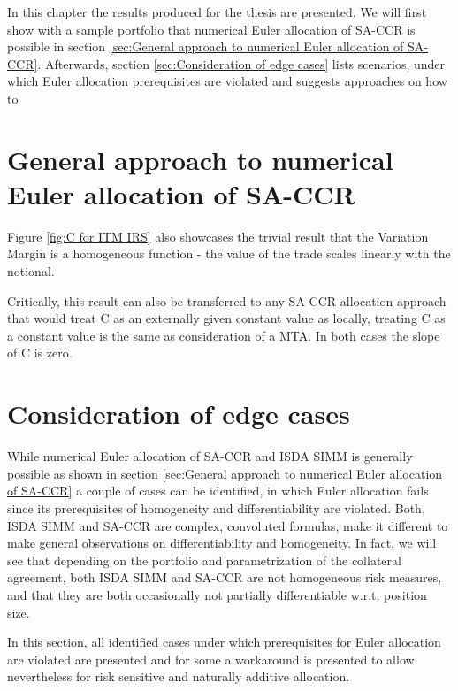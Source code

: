\documentclass[../Thesis_AHoecherl.tex]{subfiles}
\begin{document}
    In this chapter the results produced for the thesis are presented. We will first show with a sample portfolio that numerical Euler allocation of SA-CCR is possible in section \ref{sec:General approach to numerical Euler allocation of SA-CCR}. 
    Afterwards, section \ref{sec:Consideration of edge cases} lists scenarios, under which Euler allocation prerequisites are violated and suggests approaches on how to 

    \section{General approach to numerical Euler allocation of SA-CCR\label{sec:General approach to numerical Euler allocation of SA-CCR}}

    Figure \ref{fig:C for ITM IRS} also showcases the trivial result that the Variation Margin is a homogeneous function - the value of the trade scales linearly with the notional.
    
    Critically, this result can also be transferred to any SA-CCR allocation approach that would treat C as an externally given constant value as locally, treating C as a constant value is the same as consideration of a \gls{MTA}. 
    In both cases the slope of C is zero.  

    \section{Consideration of edge cases\label{sec:Consideration of edge cases}}

    While numerical Euler allocation of SA-CCR and ISDA SIMM is generally possible as shown in section \ref{sec:General approach to numerical Euler allocation of SA-CCR} a couple of cases can be identified, in which Euler allocation fails since its prerequisites of homogeneity and differentiability are violated.
    Both, ISDA SIMM and SA-CCR are complex, convoluted formulas, make it different to make general observations on differentiability and homogeneity.
    In fact, we will see that depending on the portfolio and parametrization of the collateral agreement, both ISDA SIMM and SA-CCR are not homogeneous risk measures, and that they are both occasionally not partially differentiable w.r.t. position size.

    In this section, all identified cases under which prerequisites for Euler allocation are violated are presented and for some a workaround is presented to allow nevertheless for risk sensitive and naturally additive allocation.
\end{document}
